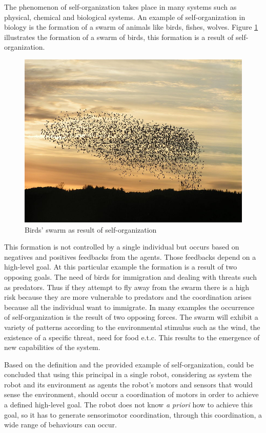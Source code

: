 \documentclass[msc,ai,logo]{infthesis}
\begin{document}
The phenomenon of self-organization takes place in many systems such as physical, chemical and biological systems. An example of self-organization in biology is the formation of a swarm of animals like birds, fishes, wolves. Figure \ref{fig:swarm} illustrates the formation of a swarm of birds, this formation is a result of self-organization. 

\begin{figure}[h]
\includegraphics[scale=0.25]{swarm.jpg}
\centering
\caption{Birds' swarm as result of self-organization}
\label{fig:swarm}
\end{figure}


This formation is not controlled by a single individual but occurs based on negatives and positives feedbacks from the agents. Those feedbacks depend on a high-level goal. At this particular example the formation is a result of two opposing goals. The need of birds for immigration and dealing with threats such as predators. Thus if they attempt to fly away from the swarm there is a high risk because they are more vulnerable to predators and the coordination arises because all the individual want to immigrate. In many examples the occurrence of self-organization is the result of two opposing forces. The swarm will exhibit a variety of patterns according to the environmental stimulus such as the wind, the existence of a specific threat, need for food e.t.c. This results to the emergence of new capabilities of the system.

Based on the definition and the provided example of self-organization, could be concluded that using this principal in a single robot, considering as system the robot and its environment as agents the robot's motors and sensors that would sense the environment, should occur a coordination of motors in order to achieve a defined high-level goal. The robot does not know \textit{a priori} how to achieve this goal, so it has to generate sensorimotor coordination, through this coordination, a wide range of behaviours can occur. 
\end{document}
